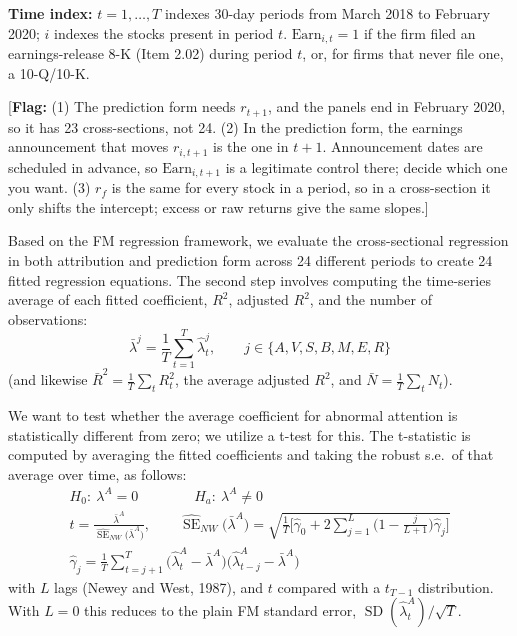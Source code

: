 \documentclass[11pt]{article}
\newcommand{\flag}[1]{{\color{red!75!black}\small [\textbf{Flag:} #1]}}
\begin{document}
\textbf{Time index:} $t = 1, \dots, T$ indexes 30-day periods from March 2018 to February 2020; $i$ indexes the stocks present in period $t$. $\text{Earn}_{i,t} = 1$ if the firm filed an earnings-release 8-K (Item 2.02) during period $t$, or, for firms that never file one, a 10-Q/10-K.

\flag{(1) The prediction form needs $r_{t+1}$, and the panels end in February 2020, so it has 23 cross-sections, not 24. (2) In the prediction form, the earnings announcement that moves $r_{i,t+1}$ is the one in $t+1$. Announcement dates are scheduled in advance, so $\text{Earn}_{i,t+1}$ is a legitimate control there; decide which one you want. (3) $r_f$ is the same for every stock in a period, so in a cross-section it only shifts the intercept; excess or raw returns give the same slopes.}

Based on the FM regression framework, we evaluate the cross-sectional regression in both attribution and prediction form across 24 different periods to create 24 fitted regression equations. The second step involves computing the time-series average of each fitted coefficient, $R^2$, adjusted $R^2$, and the number of observations:
\begin{equation}
\bar{\lambda}^{j} = \frac{1}{T}\sum_{t=1}^{T}\hat{\lambda}^{j}_{t}, \qquad j \in \{A, V, S, B, M, E, R\}
\end{equation}
(and likewise $\bar{R}^2 = \frac{1}{T}\sum_t R^2_t$, the average adjusted $R^2$, and $\bar{N} = \frac{1}{T}\sum_t N_t$).

We want to test whether the average coefficient for abnormal attention is statistically different from zero; we utilize a t-test for this. The t-statistic is computed by averaging the fitted coefficients and taking the robust s.e.\ of that average over time, as follows:
\begin{gather}
H_0:\ \lambda^{A} = 0 \qquad\qquad H_a:\ \lambda^{A} \neq 0 \\[4pt]
t = \frac{\bar{\lambda}^{A}}{\widehat{\operatorname{SE}}_{NW}\big(\bar{\lambda}^{A}\big)}, \qquad
\widehat{\operatorname{SE}}_{NW}\big(\bar{\lambda}^{A}\big) = \sqrt{\frac{1}{T}\Big[\hat{\gamma}_0 + 2\sum_{j=1}^{L}\Big(1 - \frac{j}{L+1}\Big)\hat{\gamma}_j\Big]} \\[4pt]
\hat{\gamma}_j = \frac{1}{T}\sum_{t=j+1}^{T}\big(\hat{\lambda}^{A}_{t} - \bar{\lambda}^{A}\big)\big(\hat{\lambda}^{A}_{t-j} - \bar{\lambda}^{A}\big)
\end{gather}
with $L$ lags (Newey and West, 1987), and $t$ compared with a $t_{T-1}$ distribution. With $L = 0$ this reduces to the plain FM standard error, $\operatorname{SD}(\hat{\lambda}^{A}_t)/\sqrt{T}$.
\end{document}
